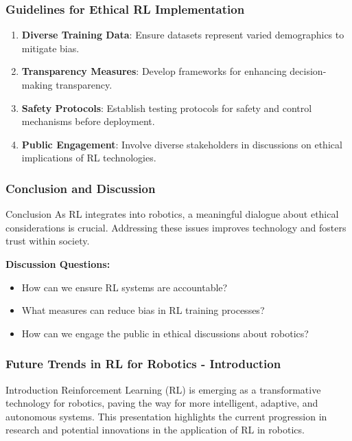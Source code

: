 \documentclass{beamer}
\begin{document}
\begin{frame}[fragile]
    \frametitle{Guidelines for Ethical RL Implementation}
    \begin{enumerate}
        \item \textbf{Diverse Training Data}: Ensure datasets represent varied demographics to mitigate bias.
        \item \textbf{Transparency Measures}: Develop frameworks for enhancing decision-making transparency.
        \item \textbf{Safety Protocols}: Establish testing protocols for safety and control mechanisms before deployment.
        \item \textbf{Public Engagement}: Involve diverse stakeholders in discussions on ethical implications of RL technologies.
    \end{enumerate}
\end{frame}

\begin{frame}[fragile]
    \frametitle{Conclusion and Discussion}
    \begin{block}{Conclusion}
        As RL integrates into robotics, a meaningful dialogue about ethical considerations is crucial. Addressing these issues improves technology and fosters trust within society.
    \end{block}
    
    \textbf{Discussion Questions:}
    \begin{itemize}
        \item How can we ensure RL systems are accountable?
        \item What measures can reduce bias in RL training processes?
        \item How can we engage the public in ethical discussions about robotics?
    \end{itemize}
\end{frame}

\begin{frame}[fragile]
    \frametitle{Future Trends in RL for Robotics - Introduction}
    \begin{block}{Introduction}
        Reinforcement Learning (RL) is emerging as a transformative technology for robotics, paving the way for more intelligent, adaptive, and autonomous systems. This presentation highlights the current progression in research and potential innovations in the application of RL in robotics.
    \end{block}
\end{frame}
\end{document}
